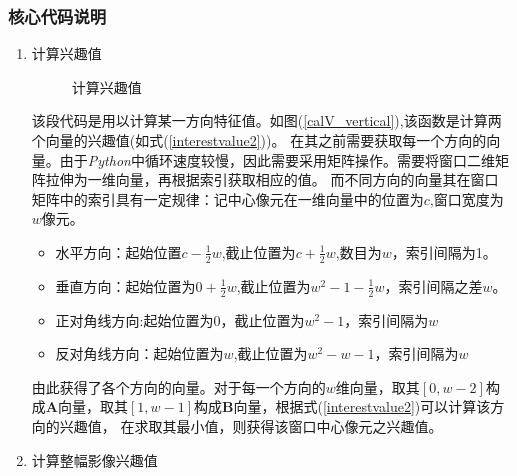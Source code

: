     \subsubsection{核心代码说明}
        \begin{enumerate}
            \item 计算兴趣值
            
            \begin{figure}[H]
                \centering
                \caption{计算兴趣值}
                \label{calVcode}
            \end{figure}


            \hspace{20pt}该段代码是用以计算某一方向特征值。如图(\ref{calV_vertical}),该函数是计算两个向量的兴趣值(如式(\ref{interestvalue2}))。
            在其之前需要获取每一个方向的向量。由于\textit{Python}中循环速度较慢，因此需要采用矩阵操作。需要将窗口二维矩阵拉伸为一维向量，再根据索引获取相应的值。
            而不同方向的向量其在窗口矩阵中的索引具有一定规律：记中心像元在一维向量中的位置为$c$,窗口宽度为$w$像元。
            \begin{itemize}
                \item 水平方向：起始位置$c-\frac{1}{2}w$,截止位置为$c+\frac{1}{2}w$,数目为$w$，索引间隔为1。
                \item 垂直方向：起始位置为$0+\frac{1}{2}w$,截止位置为$w^2-1-\frac{1}{2}w$，索引间隔之差$w$。
                \item 正对角线方向:起始位置为$0$，截止位置为$w^2-1$，索引间隔为$w$
                \item 反对角线方向：起始位置为$w$,截止位置为$w^2-w-1$，索引间隔为$w$
            \end{itemize}
            由此获得了各个方向的向量。对于每一个方向的$w$维向量，取其$[0,w-2]$构成$\bm{A}$向量，取其$[1,w-1]$构成$\bm{B}$向量，根据式(\ref{interestvalue2})可以计算该方向的兴趣值，
            在求取其最小值，则获得该窗口中心像元之兴趣值。

            \item 计算整幅影像兴趣值
            

\end{enumerate}
